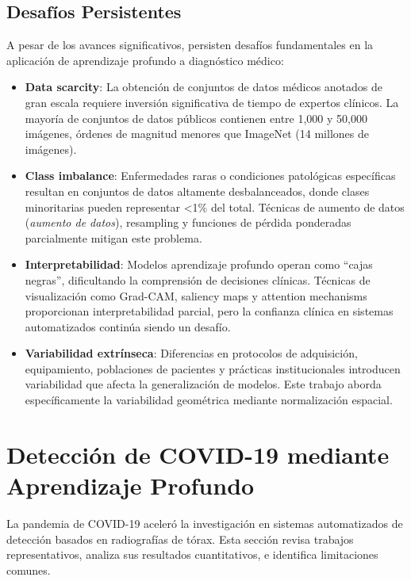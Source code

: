 \subsection{Desafíos Persistentes}

A pesar de los avances significativos, persisten desafíos fundamentales en la aplicación de aprendizaje profundo a diagnóstico médico:

\begin{itemize}
\item \textbf{Data scarcity}: La obtención de conjuntos de datos médicos anotados de gran escala requiere inversión significativa de tiempo de expertos clínicos. La mayoría de conjuntos de datos públicos contienen entre 1,000 y 50,000 imágenes, órdenes de magnitud menores que ImageNet (14 millones de imágenes).

\item \textbf{Class imbalance}: Enfermedades raras o condiciones patológicas específicas resultan en conjuntos de datos altamente desbalanceados, donde clases minoritarias pueden representar <1\% del total. Técnicas de aumento de datos (\textit{aumento de datos}), resampling y funciones de pérdida ponderadas parcialmente mitigan este problema.

\item \textbf{Interpretabilidad}: Modelos aprendizaje profundo operan como ``cajas negras'', dificultando la comprensión de decisiones clínicas. Técnicas de visualización como Grad-CAM, saliency maps y attention mechanisms proporcionan interpretabilidad parcial, pero la confianza clínica en sistemas automatizados continúa siendo un desafío.

\item \textbf{Variabilidad extrínseca}: Diferencias en protocolos de adquisición, equipamiento, poblaciones de pacientes y prácticas institucionales introducen variabilidad que afecta la generalización de modelos. Este trabajo aborda específicamente la variabilidad geométrica mediante normalización espacial.
\end{itemize}

\section{Detección de COVID-19 mediante Aprendizaje Profundo}
\label{sec:covid19_detection}

La pandemia de COVID-19 aceleró la investigación en sistemas automatizados de detección basados en radiografías de tórax. Esta sección revisa trabajos representativos, analiza sus resultados cuantitativos, e identifica limitaciones comunes.

